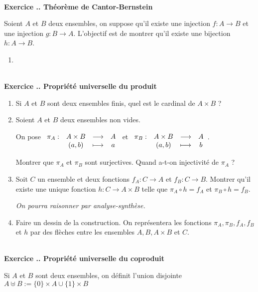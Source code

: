 \documentclass{article}
\newcommand{\fonction}[5]{\raisebox{-0.5\baselineskip}{$\begin{array}{lccc}
    #1: & #2 & \longrightarrow & #3 \\
        & #4 & \longmapsto & #5 \end{array}$}}
\newcounter{exo}
\newcommand{\exercice}[1][\null]{\textbf{\\ \large Exercice \thesection.\theexo. \normalsize #1} \addtocounter{exo}{1}}
\begin{document}
\exercice[Théorème de Cantor-Bernstein]

Soient $A$ et $B$ deux ensembles, on suppose qu'il existe une injection $f : A \rightarrow B$ et une injection $g : B \rightarrow A$. L'objectif est de montrer qu'il existe une bijection $h : A \rightarrow B$.

\begin{enumerate}

\item 

\end{enumerate}






\exercice[Propriété universelle du produit]

\begin{enumerate}

\item Si $A$ et $B$ sont deux ensembles finis, quel est le cardinal de $A \times B$ ?

\item Soient $A$ et $B$ deux ensembles non vides.

On pose $\fonction{\pi_A}{A\times B}{A}{(a,b)}{a}$ et $\fonction{\pi_B}{A\times B}{A}{(a,b)}{b}$.

Montrer que $\pi_A$ et $\pi_B$ sont surjectives. Quand a-t-on injectivité de $\pi_A$ ?

\item Soit $C$ un ensemble et deux fonctions $f_A : C \rightarrow A$ et $f_B : C \rightarrow B$. Montrer qu'il existe une unique fonction $h : C \rightarrow A \times B$ telle que $\pi_A \circ h = f_A$ et $\pi_B \circ h = f_B$. 

\emph{On pourra raisonner par analyse-synthèse.}

\item Faire un dessin de la construction. On représentera les fonctions $\pi_A, \pi_B, f_A, f_B$ et $h$ par des flèches entre les ensembles $A, B, A \times B$ et $C$.

\end{enumerate}





\exercice[Propriété universelle du coproduit]

 Si $A$ et $B$ sont deux ensembles, on définit l'union disjointe $A \uplus B := \{0\} \times A \cup \{1\} \times B $
\end{document}
